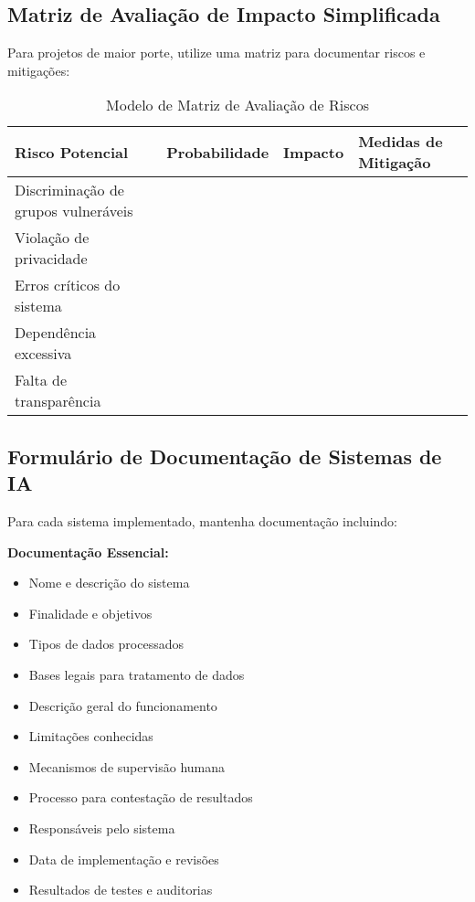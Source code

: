 \documentclass[12pt,a4paper]{article}
\begin{document}
\subsection{Matriz de Avaliação de Impacto Simplificada}

Para projetos de maior porte, utilize uma matriz para documentar riscos e mitigações:

\begin{table}[h]
\centering
\begin{tabular}{|p{3cm}|p{3cm}|p{3cm}|p{3cm}|}
\hline
\textbf{Risco Potencial} & \textbf{Probabilidade} & \textbf{Impacto} & \textbf{Medidas de Mitigação} \\
\hline
Discriminação de grupos vulneráveis & & & \\
\hline
Violação de privacidade & & & \\
\hline
Erros críticos do sistema & & & \\
\hline
Dependência excessiva & & & \\
\hline
Falta de transparência & & & \\
\hline
\end{tabular}
\caption{Modelo de Matriz de Avaliação de Riscos}
\end{table}

\subsection{Formulário de Documentação de Sistemas de IA}

Para cada sistema implementado, mantenha documentação incluindo:

\begin{tcolorbox}[highlight]
\textbf{Documentação Essencial:}
\begin{itemize}
    \item Nome e descrição do sistema
    \item Finalidade e objetivos
    \item Tipos de dados processados
    \item Bases legais para tratamento de dados
    \item Descrição geral do funcionamento
    \item Limitações conhecidas
    \item Mecanismos de supervisão humana
    \item Processo para contestação de resultados
    \item Responsáveis pelo sistema
    \item Data de implementação e revisões
    \item Resultados de testes e auditorias
\end{itemize}
\end{tcolorbox}
\end{document}
